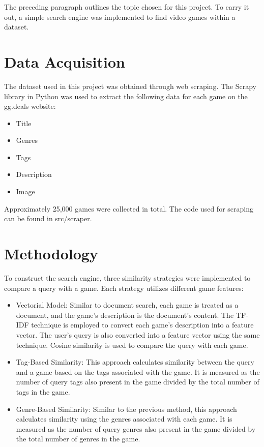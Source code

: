 \documentclass{llncs}
\begin{document}
The preceding paragraph outlines the topic chosen for this project. To carry it out, a simple search engine was implemented to find video games within a dataset.

\section{Data Acquisition}

The dataset used in this project was obtained through web scraping. The Scrapy library in Python was used to extract the following data for each game on the gg.deals website:

\begin{itemize}
    \item Title
    \item Genres
    \item Tags
    \item Description
    \item Image
\end{itemize}

Approximately 25,000 games were collected in total. The code used for scraping can be found in src/scraper.

\section{Methodology}

To construct the search engine, three similarity strategies were implemented to compare a query with a game. Each strategy utilizes different game features:

\begin{itemize}
  \item Vectorial Model: Similar to document search, each game is treated as a document, and the game's description is the document's content. The TF-IDF technique is employed to convert each game's description into a feature vector. The user's query is also converted into a feature vector using the same technique. Cosine similarity is used to compare the query with each game.
  \item Tag-Based Similarity: This approach calculates similarity between the query and a game based on the tags associated with the game. It is measured as the number of query tags also present in the game divided by the total number of tags in the game.
  \item Genre-Based Similarity: Similar to the previous method, this approach calculates similarity using the genres associated with each game. It is measured as the number of query genres also present in the game divided by the total number of genres in the game.
\end{itemize}
\end{document}
